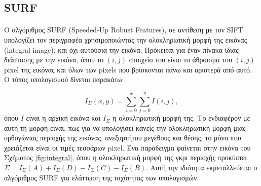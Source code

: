 


\subsection{SURF}
\paragraph*{}
Ο αλγόριθμος SURF \cite{surf} (Speeded-Up Robust Features), σε αντίθεση με τον SIFT υπολογίζει τον περιγραφέα χρησιμοποιώντας την ολοκληρωτική μορφή της εικόνας (integral image), και όχι αυτούσια την εικόνα. Πρόκειται για έναν πίνακα ίδιας διάστασης με την εικόνα, όπου το $(i,j)$ στοιχείο του είναι το άθροισμα του $(i,j)$ pixel της εικόνας και όλων των pixels που βρίσκονται πάνω και αριστερά από αυτό. Ο τύπος υπολογισμού δίνεται παρακάτω:

\begin{equation}
I_\Sigma(x,y) = \sum_{i=0}^{x}\sum_{j=0}^{y}I(i,j),
\end{equation}
όπου $I$ είναι η αρχική εικόνα και $I_\Sigma$ η ολοκληρωτική μορφή της. Το ενδιαφέρον με αυτή τη μορφή είναι, πως για να υπολογίσει κανείς την ολοκληρωτική μορφή μιας ορθογώνιας περιοχής της εικόνας, ανεξαρτήτου μεγέθους και θέσης, το μόνο που χρειάζεται είναι οι τιμές τεσσάρων pixel. Ένα παράδειγμα φαίνεται στην εικόνα του Σχήματος \ref{fig:integral}, όπου η ολοκληρωτική μορφή της γκρι περιοχής προκύπτει $\Sigma = I_\Sigma(A)+I_\Sigma(D)-I_\Sigma(C)-I_\Sigma(B)$. Αυτή την ιδιότητα εκμεταλλεύεται ο αλγόριθμος SURF για ελάττωση της ταχύτητας των υπολογισμών.

